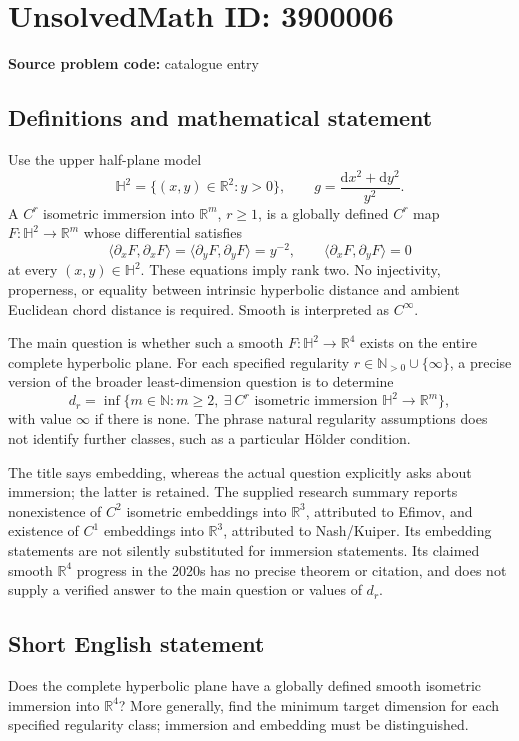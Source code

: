 \documentclass[11pt]{article}
\newcommand{\N}{\mathbb{N}}
\newcommand{\R}{\mathbb{R}}
\begin{document}
\section*{UnsolvedMath ID: 3900006}
\textbf{Source problem code:} catalogue entry
\subsection{Definitions and mathematical statement}
Use the upper half-plane model
\[
\mathbb H^2=\{(x,y)\in\R^2:y>0\},\qquad
 g=\frac{\mathrm dx^2+\mathrm dy^2}{y^2}.
\]
A \(C^r\) isometric immersion into \(\R^m\), \(r\ge1\), is a globally defined \(C^r\) map \(F:\mathbb H^2\to\R^m\) whose differential satisfies
\[
\langle\partial_xF,\partial_xF\rangle
=\langle\partial_yF,\partial_yF\rangle=y^{-2},
\qquad \langle\partial_xF,\partial_yF\rangle=0
\]
at every \((x,y)\in\mathbb H^2\). These equations imply rank two. No injectivity, properness, or equality between intrinsic hyperbolic distance and ambient Euclidean chord distance is required. Smooth is interpreted as \(C^\infty\).

The main question is whether such a smooth \(F:\mathbb H^2\to\R^4\) exists on the entire complete hyperbolic plane. For each specified regularity \(r\in\N_{>0}\cup\{\infty\}\), a precise version of the broader least-dimension question is to determine
\[
d_r=\inf\{m\in\N:m\ge2,\ \exists\ C^r\text{ isometric immersion }\mathbb H^2\to\R^m\},
\]
with value \(\infty\) if there is none. The phrase natural regularity assumptions does not identify further classes, such as a particular Hölder condition.

The title says embedding, whereas the actual question explicitly asks about immersion; the latter is retained. The supplied research summary reports nonexistence of \(C^2\) isometric embeddings into \(\R^3\), attributed to Efimov, and existence of \(C^1\) embeddings into \(\R^3\), attributed to Nash/Kuiper. Its embedding statements are not silently substituted for immersion statements. Its claimed smooth \(\R^4\) progress in the 2020s has no precise theorem or citation, and does not supply a verified answer to the main question or values of \(d_r\).
\subsection{Short English statement}
Does the complete hyperbolic plane have a globally defined smooth isometric immersion into \(\R^4\)? More generally, find the minimum target dimension for each specified regularity class; immersion and embedding must be distinguished.
\end{document}
